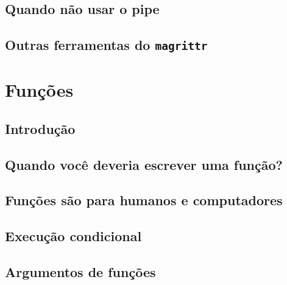 \documentclass[
]{latex/krantz}
\theoremstyle{definition}
\theoremstyle{definition}
\theoremstyle{definition}
\theoremstyle{definition}
\theoremstyle{remark}
\begin{document}
\hypertarget{quando-nuxe3o-usar-o-pipe}{%
\section{Quando não usar o pipe}\label{quando-nuxe3o-usar-o-pipe}}

\hypertarget{outras-ferramentas-do-magrittr}{%
\section{\texorpdfstring{Outras ferramentas do \texttt{magrittr}}{Outras ferramentas do magrittr}}\label{outras-ferramentas-do-magrittr}}

\hypertarget{funuxe7uxf5es}{%
\chapter{Funções}\label{funuxe7uxf5es}}

\hypertarget{introduuxe7uxe3o-11}{%
\section{Introdução}\label{introduuxe7uxe3o-11}}

\hypertarget{quando-vocuxea-deveria-escrever-uma-funuxe7uxe3o}{%
\section{Quando você deveria escrever uma função?}\label{quando-vocuxea-deveria-escrever-uma-funuxe7uxe3o}}

\hypertarget{funuxe7uxf5es-suxe3o-para-humanos-e-computadores}{%
\section{Funções são para humanos e computadores}\label{funuxe7uxf5es-suxe3o-para-humanos-e-computadores}}

\hypertarget{execuuxe7uxe3o-condicional}{%
\section{Execução condicional}\label{execuuxe7uxe3o-condicional}}

\hypertarget{argumentos-de-funuxe7uxf5es}{%
\section{Argumentos de funções}\label{argumentos-de-funuxe7uxf5es}}
\end{document}

